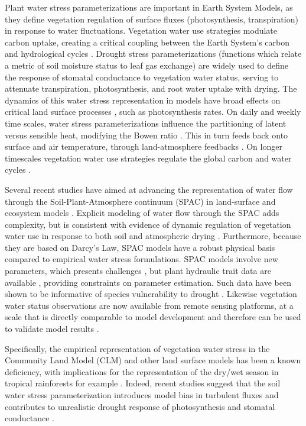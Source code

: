 \documentclass[draft,linenumbers]{agujournal}
\begin{document}
Plant water stress parameterizations are important in Earth System Models, as they define vegetation regulation of surface fluxes (photosynthesis, transpiration) in response to water fluctuations.
Vegetation water use strategies modulate carbon uptake, creating a critical coupling between the Earth System's carbon and hydrological cycles \citep{green2017}.
Drought stress parameterizations (functions which relate a metric of soil moisture status to leaf gas exchange) are widely used to define the response of stomatal conductance to vegetation water status, serving to attenuate transpiration, photosynthesis, and root water uptake with drying.
The dynamics of this water stress representation in models have broad effects on critical land surface processes \citep{joetzjer2014}, such as photosynthesis rates.
On daily and weekly time scales, water stress parameterizations influence the partitioning of latent versus sensible heat, modifying the Bowen ratio \citep{gentine2007,gentine2011}. 
This in turn feeds back onto surface and air temperature, through land-atmosphere feedbacks \citep{bonan2008}.
On longer timescales vegetation water use strategies regulate the global carbon and water cycles \citep{dekauwe2015}.

Several recent studies have aimed at advancing the representation of water flow through the Soil-Plant-Atmosphere continuum (SPAC) in land-surface and ecosystem models \citep{xu2016,christoffersen2016,sperry2017}.
Explicit modeling of water flow through the SPAC adds complexity, but is consistent with evidence of dynamic regulation of vegetation water use in response to both soil and atmospheric drying \citep{sperry2015}.
Furthermore, because they are based on Darcy's Law, SPAC models have a robust physical basis compared to empirical water stress formulations.
SPAC models involve new parameters, which presents challenges \citep{drake2017}, but plant hydraulic trait data are available \citep{kattge2011,anderegg2015a}, providing constraints on parameter estimation.   
Such data have been shown to be informative of species vulnerability to drought \citep{choat2012}.
Likewise vegetation water status observations are now available from remote sensing platforms, at a scale that is directly comparable to model development \citep{konings2016,grant2016} and therefore can be used to validate model results \citep{momen2017,konings2017b}.

Specifically, the empirical representation of vegetation water stress in the Community Land Model (CLM) and other land surface models has been a known deficiency, with implications for the representation of the dry/wet season in tropical rainforests for example \citep{powell2013,ukkola2016}. Indeed, recent studies suggest that the soil water stress parameterization introduces model bias in turbulent fluxes \citep{bonan2014} and contributes to unrealistic drought response of photosynthesis and stomatal conductance \citep{powell2013}.
\end{document}

